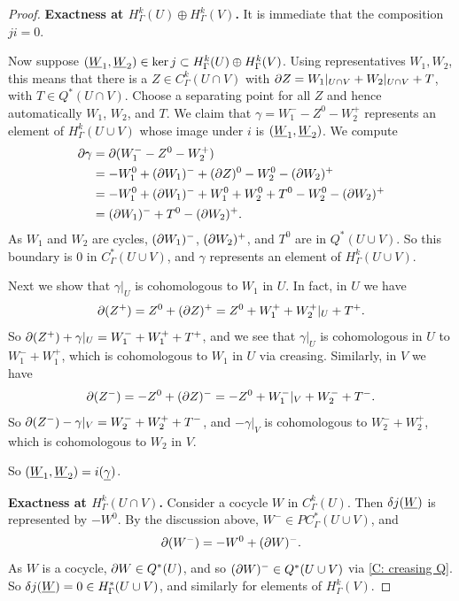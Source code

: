 \begin{proof}
	\textbf{Exactness at $H^k_\Gamma(U) \oplus H^k_\Gamma(V)$.}
	It is immediate that the composition $ji = 0$.

	Now suppose $(\underline{W}_1,\underline{W}_2) \in \ker j \subset H^k_\Gamma(U) \oplus H^k_\Gamma(V)$.
	Using representatives $W_1,W_2$, this means that there is a $Z \in C^k_\Gamma(U \cap V)$ with $\partial Z = W_1|_{U \cap V}+W_2|_{U \cap V}+T$, with $T \in Q^*(U \cap V)$.
	Choose a separating point for all $Z$ and hence automatically $W_1$, $W_2$, and $T$.
	We claim that $\gamma = W_1^- - Z^0 -W_2^+$ represents an element of $H^k_\Gamma(U \cup V)$ whose image under $i$ is $(\underline{W}_1,\underline{W}_2)$.
	We compute
	\begin{align*}\partial \gamma& = \partial (W_1^- - Z^0 -W_2^+)\\
		& = -W_1^0 +(\partial W_1)^- + (\partial Z)^0 - W_2^0 - (\partial W_2)^+\\
		& = -W_1^0 +(\partial W_1)^- + W_1^0+W_2^0+T^0 - W_2^0 - (\partial W_2)^+\\
		& = (\partial W_1)^- +T^0 - (\partial W_2)^+.
	\end{align*}
	As $W_1$ and $W_2$ are cycles, $(\partial W_1)^-$, $(\partial W_2)^+$, and $T^0$ are in $Q^*(U \cup V)$.
	So this boundary is $0$ in $C^*_\Gamma(U \cup V)$, and $\gamma$ represents an element of $H^k_\Gamma(U \cup V)$.

	Next we show that $\gamma|_U$ is cohomologous to $W_1$ in $U$.
	In fact, in $U$ we have
	$$\partial (Z^+) = Z^0+(\partial Z)^+ = Z^0+ W_1^++ W_2^+|_{U}+T^+.$$ So
	$\partial (Z^+) +\gamma|_U = W_1^-+W_1^+ +T^+$, and we see that $\gamma|_U$ is cohomologous in $U$ to $W_1^-+W_1^+$, which is cohomologous to $W_1$ in $U$ via creasing.
	Similarly, in $V$ we have
	$$\partial (Z^-) = -Z^0+(\partial Z)^- = -Z^0+W_1^-|_{V}+ W_2^-+T^-.$$
	So
	$\partial(Z^-) - \gamma|_V = W_2^-+W_2^+ +T^-$, and $-\gamma|_V$ is cohomologous to $W_2^-+W_2^+$, which is cohomologous to $W_2$ in $V$.

	So $(\underline{W}_1,\underline{W}_2) = i(\underline{\gamma})$.

	\textbf{Exactness at $H^k_\Gamma(U \cap V)$.}
	Consider a cocycle $W$ in $C^k_\Gamma(U)$.
	Then $\delta j(\underline{W})$ is represented by $-W^0$.
	By the discussion above, $W^- \in PC^*_\Gamma(U \cup V)$, and $$\partial (W^-) = -W^0+ (\partial W)^-.$$ As $W$ is a cocycle, $\partial W \in Q^*(U)$, and so $(\partial W)^- \in Q^*(U \cup V)$ via \cref{C: creasing Q}.
	So $\delta j(\underline{W}) = 0 \in H^*_\Gamma(U \cup V)$, and similarly for elements of $H^k_\Gamma(V)$.


\end{proof}
